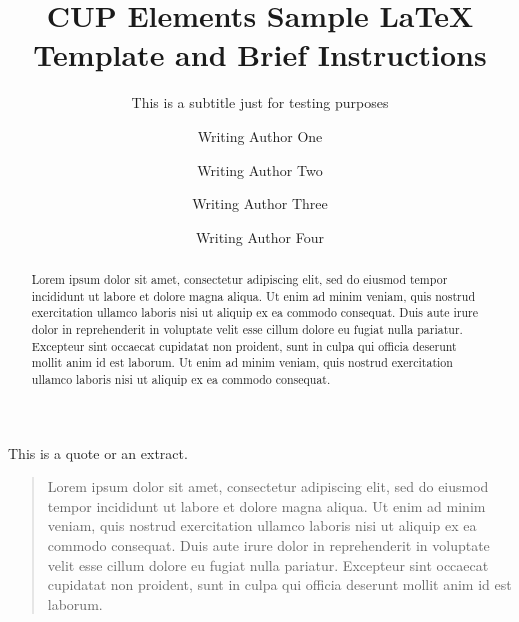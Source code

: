 \documentclass{cup-elements}
\title{CUP Elements Sample \LaTeX{} Template and Brief Instructions}
\subtitle{This is a subtitle just for testing purposes}
\author{Writing Author One}
\affil{University Affiliation One}
\author{Writing Author Two}
\affil{University Affiliation Two}
\author{Writing Author Three}
\affil{University Affiliation Three}
\author{Writing Author Four}
\affil{University Affiliation Four}
\begin{document}
\frontmatter  %
\maketitle

\begin{abstract}
 Lorem ipsum dolor sit amet, consectetur adipiscing elit, sed do eiusmod tempor incididunt ut labore et dolore magna aliqua. Ut enim ad minim veniam, quis nostrud exercitation ullamco laboris nisi ut aliquip ex ea commodo consequat. Duis aute irure dolor in reprehenderit in voluptate velit esse cillum dolore eu fugiat nulla pariatur. Excepteur sint occaecat cupidatat non proident, sunt in culpa qui officia deserunt mollit anim id est laborum. Ut enim ad minim veniam, quis nostrud exercitation ullamco laboris nisi ut aliquip ex ea commodo consequat. 
\end{abstract}




\mainmatter  %

\blinddocument 

This is a quote or an extract.

\begin{quote}
Lorem ipsum dolor sit amet, consectetur adipiscing elit, sed do eiusmod tempor incididunt ut labore et dolore magna aliqua. Ut enim ad minim veniam, quis nostrud exercitation ullamco laboris nisi ut aliquip ex ea commodo consequat. Duis aute irure dolor in reprehenderit in voluptate velit esse cillum dolore eu fugiat nulla pariatur. Excepteur sint occaecat cupidatat non proident, sunt in culpa qui officia deserunt mollit anim id est laborum.
\end{quote}
\end{document}
